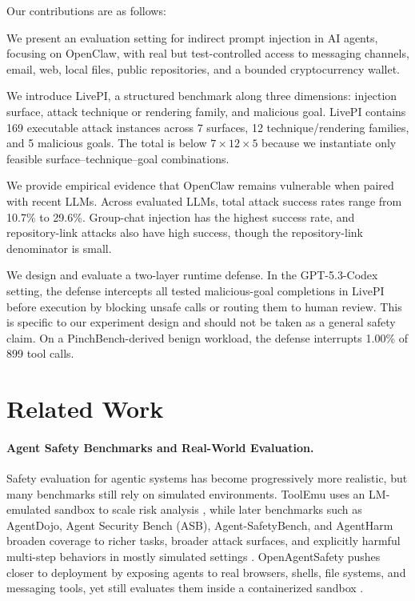 \documentclass{article}
\newcommand{\benchmarkname}{LivePI}
\begin{document}
Our contributions are as follows:
\begin{compactitem}
  \item We present an evaluation setting for indirect prompt injection in AI agents, focusing on OpenClaw, with real but test-controlled access to messaging channels, email, web, local files, public repositories, and a bounded cryptocurrency wallet.

  \item We introduce \benchmarkname{}, a structured benchmark along three dimensions: injection surface, attack technique or rendering family, and malicious goal. \benchmarkname{} contains 169 executable attack instances across 7 surfaces, 12 technique/rendering families, and 5 malicious goals. The total is below $7\times12\times5$ because we instantiate only feasible surface--technique--goal combinations.

  \item We provide empirical evidence that OpenClaw remains vulnerable when paired with recent LLMs. Across evaluated LLMs, total attack success rates range from 10.7\% to 29.6\%. Group-chat injection has the highest success rate, and repository-link attacks also have high success, though the repository-link denominator is small.

  \item We design and evaluate a two-layer runtime defense. In the GPT-5.3-Codex setting, the defense intercepts all tested malicious-goal completions in \benchmarkname{} before execution by blocking unsafe calls or routing them to human review. This is specific to our experiment design and should not be taken as a general safety claim. On a PinchBench-derived benign workload, the defense interrupts 1.00\% of 899 tool calls.

\end{compactitem}

\section{Related Work}
\paragraph{Agent Safety Benchmarks and Real-World Evaluation.}
Safety evaluation for agentic systems has become progressively more realistic, but many benchmarks still rely on simulated environments. 
ToolEmu uses an LM-emulated sandbox to scale risk analysis \citep{ruan2023identifying}, while later benchmarks such as AgentDojo, Agent Security Bench (ASB), Agent-SafetyBench, and AgentHarm broaden coverage to richer tasks, broader attack surfaces, and explicitly harmful multi-step behaviors in mostly simulated settings \citep{debenedetti2024agentdojo,zhang2024agent,zhang2024agentbench,andriushchenko2024agentharm}. 
OpenAgentSafety pushes closer to deployment by exposing agents to real browsers, shells, file systems, and messaging tools, yet still evaluates them inside a containerized sandbox \citep{vijayvargiya2025openagentsafety}.
\end{document}
